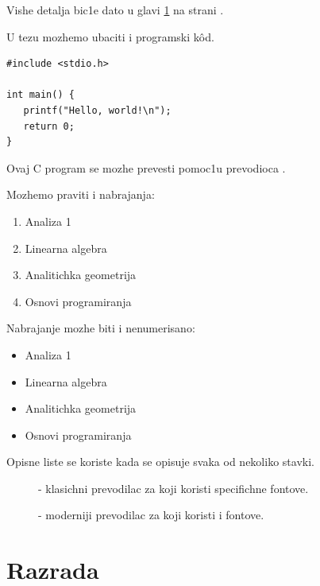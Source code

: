 \documentclass[12pt,oneside]{memoir}
\begin{document}
Vishe detalja bic1e dato u glavi \ref{chp:razrada} na strani \pageref{chp:razrada}.

U tezu mozhemo ubaciti i programski kôd.

\begin{english}
\begin{lstlisting}
#include <stdio.h>

int main() {
   printf("Hello, world!\n");
   return 0;
}
\end{lstlisting}
\end{english}

Ovaj C program se mozhe prevesti pomoc1u prevodioca \cite{gcc}.

Mozhemo praviti i nabrajanja:
\begin{enumerate}
\item Analiza 1
\item Linearna algebra
\item Analitichka geometrija
\item Osnovi programiranja
\end{enumerate}

Nabrajanje mozhe biti i nenumerisano:

\begin{itemize}
\item Analiza 1
\item Linearna algebra
\item Analitichka geometrija
\item Osnovi programiranja
\end{itemize}

Opisne liste se koriste kada se opisuje svaka od nekoliko stavki.

\begin{description}
\item[] - klasichni prevodilac za \lat{\LaTeX} koji
  koristi specifichne fontove.
\item[] - moderniji prevodilac za \lat{\LaTeX} koji
  koristi  i  fontove.
\end{description}

\pangrami

\chapter{Razrada}
\label{chp:razrada}
\end{document}
